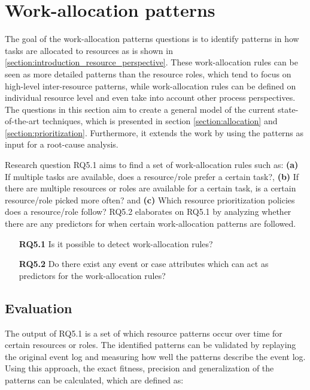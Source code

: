 

\section{Work-allocation patterns}
The goal of the work-allocation patterns questions is to identify patterns in how tasks are allocated to resources as is shown in \ref{section:introduction_resource_perspective}. These work-allocation rules can be seen as more detailed patterns than the resource roles, which tend to focus on high-level inter-resource patterns, while work-allocation rules can be defined on individual resource level and even take into account other process perspectives. The questions in this section aim to create a general model of the current state-of-the-art techniques, which is presented in section \ref{section:allocation} and \ref{section:prioritization}. Furthermore, it extends the work by using the patterns as input for a root-cause analysis.

Research question RQ5.1 aims to find a set of work-allocation rules such as: \textbf{(a)} If multiple tasks are available, does a resource/role prefer a certain task?, \textbf{(b)} If there are multiple resources or roles are available for a certain task, is a certain resource/role picked more often? and \textbf{(c)} Which resource prioritization policies does a resource/role follow? RQ5.2 elaborates on RQ5.1 by analyzing whether there are any predictors for when certain work-allocation patterns are followed. 

\begin{enumerate}
\item[\textbf{RQ5.1}] Is it possible to detect work-allocation rules?
\item[\textbf{RQ5.2}] Do there exist any event or case attributes which can act as predictors for the work-allocation rules? 
\end{enumerate}

\subsection{Evaluation}
The output of RQ5.1 is a set of which resource patterns occur over time for certain resources or roles. The identified patterns can be validated by replaying the original event log and measuring how well the patterns describe the event log. Using this approach, the exact fitness, precision and generalization of the patterns can be calculated, which are defined as:

